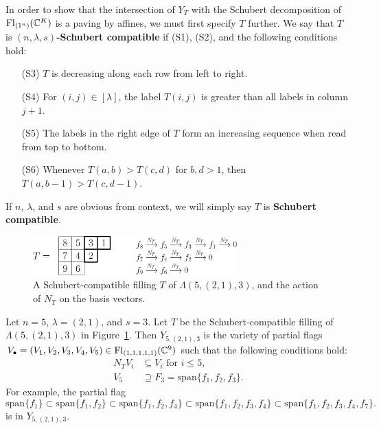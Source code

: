 \documentclass[12pt]{amsart}
\newcommand{\vspan}{\mathrm{span}}
\newcommand{\Fl}{\mathrm{Fl}}
\begin{document}
In order to show that the intersection of $Y_{T}$ with the Schubert decomposition of $\Fl_{(1^n)}(\bC^K)$ is a paving by affines,
we must first specify $T$ further. 
We say that $T$ is {\bf $(n,\lambda,s)$-Schubert compatible} if (S1), (S2), and the following conditions hold:
\begin{enumerate}
\item[(S3)] $T$ is decreasing along each row from left to right.%
\item[(S4)] For $(i,j)\in [\lambda]$, the label $T(i,j)$ is greater than all labels in column $j+1$. %
\item[(S5)] The labels in the right edge of $T$ form an increasing sequence when read from top to bottom.%
\item[(S6)] Whenever $T(a,b)>T(c,d)$ for $b,d>1$, then $T(a,b-1)>T(c,d-1)$.
\end{enumerate}
If $n$, $\lambda$, and $s$ are obvious from context, we will simply say $T$ is {\bf Schubert compatible}.


\begin{figure}
    \centering
    \includegraphics[width=0.7\textwidth]{SchubertCompatible.eps}
    \caption{A Schubert-compatible filling $T$ of $\Lambda(5,(2,1),3)$, and the action of $N_T$ on the basis vectors.}
    \label{fig:SchubertCompatible}
\end{figure}

\begin{example}
Let $n=5$, $\lambda = (2,1)$, and $s=3$. Let $T$ be the Schubert-compatible filling of $\Lambda(5,(2,1),3)$ in Figure~\ref{fig:SchubertCompatible}. Then $Y_{5,(2,1),3}$ is the variety of partial flags $V_\bullet = (V_1,V_2,V_3,V_4,V_5)\in \Fl_{(1,1,1,1,1)}(\bC^9)$ such that the following conditions hold:
\begin{align}
N_T V_i &\subseteq V_{i} \text{ for } i \leq 5, \\
V_5 &\supseteq F_3 = \vspan\{f_1,f_2,f_3\}.
\end{align}
For example, the partial flag 
\begin{equation*}\label{eq:PartialFlag}
\vspan\{ f_1 \} \subset \vspan\{ f_1,f_2 \} \subset 
\vspan\{ f_{1},f_{2},f_{4} \} \subset \vspan\{ f_{1},f_{2},f_{3},f_{4} \} \subset \vspan\{ f_{1},f_{2},f_{3},f_{4},f_{7}\}.
\end{equation*}
is in $Y_{5,(2,1),3}$.
\end{example}
\end{document}
